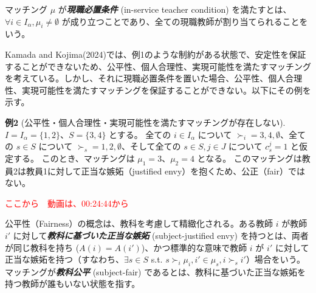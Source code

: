 \documentclass[12pt, a4paper]{article}
\theoremstyle{definition}
\newtheorem{defn}{定義}
\theoremstyle{remark}
\theoremstyle{plain}
\begin{document}
マッチング $\mu$ が\textbf{\textit{現職必置条件}} (in-service teacher condition) を満たすとは、$\forall i \in I_{\alpha}, \mu_i \neq \emptyset$ が成り立つことであり、全ての現職教師が割り当てられることをいう。


Kamada and Kojima(2024)では、例1のような制約がある状態で、安定性を保証することができないため、公平性、個人合理性、実現可能性を満たすマッチングを考えている。しかし、それに現職必置条件を置いた場合、公平性、個人合理性、実現可能性を満たすマッチングを保証することができない。以下にその例を示す。

\textbf{例2} (公平性・個人合理性・実現可能性を満たすマッチングが存在しない). 
$I = I_\alpha = \{1, 2\}$、$S = \{3, 4\}$ とする。
全ての $i \in I_\alpha$ について $\succ_i = 3, 4, \emptyset$、全ての $s \in S$ について $\succ_s = 1, 2, \emptyset$、そして全ての $s \in S, j \in J$ について $c_s^j = 1$ と仮定する。
このとき、マッチングは $\mu_1 = 3$、$\mu_2 = 4$ となる。
このマッチングは教員2は教員1に対して正当な嫉妬（justified envy）を抱くため、公正（fair）ではない。


\textcolor{red}{ここから　動画は、00:24:44から}




公平性（Fairness）の概念は、教科を考慮して精緻化される。ある教師 $i$ が教師 $i'$ に対して\textbf{\textit{教科に基づいた正当な嫉妬}} (subject-justified envy) を持つとは、両者が同じ教科を持ち ($A(i) = A(i')$)、かつ標準的な意味で教師 $i$ が $i'$ に対して正当な嫉妬を持つ（すなわち、$\exists s \in S$ s.t. $s \succ_i \mu_i, i' \in \mu_s, i \succ_s i'$）場合をいう。マッチングが\textbf{\textit{教科公平}} (subject-fair) であるとは、教科に基づいた正当な嫉妬を持つ教師が誰もいない状態を指す。


  
\end{document}
